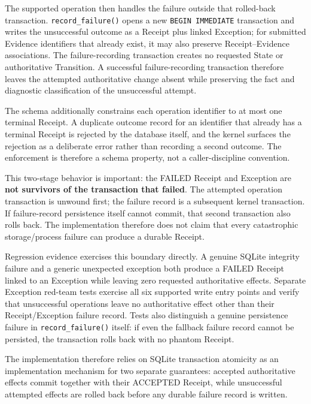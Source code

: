 \documentclass[11pt]{article}
\begin{document}
The supported operation then handles the failure outside that rolled-back transaction. \texttt{record\_failure()} opens a new \texttt{BEGIN IMMEDIATE} transaction and writes the unsuccessful outcome as a Receipt plus linked Exception; for submitted Evidence identifiers that already exist, it may also preserve Receipt--Evidence associations. The failure-recording transaction creates no requested State or authoritative Transition. A successful failure-recording transaction therefore leaves the attempted authoritative change absent while preserving the fact and diagnostic classification of the unsuccessful attempt.

The schema additionally constrains each operation identifier to at most one terminal Receipt. A duplicate outcome record for an identifier that already has a terminal Receipt is rejected by the database itself, and the kernel surfaces the rejection as a deliberate error rather than recording a second outcome. The enforcement is therefore a schema property, not a caller-discipline convention.

This two-stage behavior is important: the FAILED Receipt and Exception are \textbf{not survivors of the transaction that failed}. The attempted operation transaction is unwound first; the failure record is a subsequent kernel transaction. If failure-record persistence itself cannot commit, that second transaction also rolls back. The implementation therefore does not claim that every catastrophic storage/process failure can produce a durable Receipt.

Regression evidence exercises this boundary directly. A genuine SQLite integrity failure and a generic unexpected exception both produce a FAILED Receipt linked to an Exception while leaving zero requested authoritative effects. Separate Exception red-team tests exercise all six supported write entry points and verify that unsuccessful operations leave no authoritative effect other than their Receipt/Exception failure record. Tests also distinguish a genuine persistence failure in \texttt{record\_failure()} itself: if even the fallback failure record cannot be persisted, the transaction rolls back with no phantom Receipt.

The implementation therefore relies on SQLite transaction atomicity as an implementation mechanism for two separate guarantees: accepted authoritative effects commit together with their ACCEPTED Receipt, while unsuccessful attempted effects are rolled back before any durable failure record is written.
\end{document}
